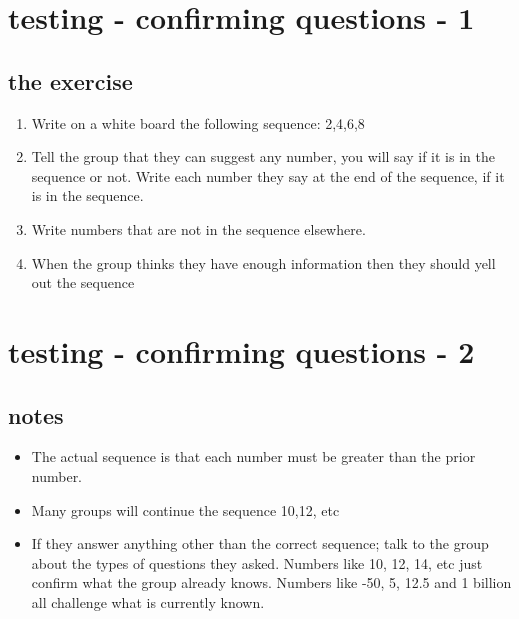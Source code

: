 \section*{testing - confirming questions - 1}
\subsection*{the exercise}
\begin{enumerate}
\item Write on a white board the following sequence: 2,4,6,8
\item Tell the group that they can suggest any number, you will say if it is in the sequence or not. Write each number they say at the end of the sequence, if it is in the sequence.
\item Write numbers that are not in the sequence elsewhere.
\item When the group thinks they have enough information then they should yell out the sequence
\end{enumerate}
\clearpage
\section*{testing - confirming questions - 2}
\subsection*{notes}
\begin{itemize}
\item The actual sequence is that each number must be greater than the prior number.
\item Many groups will continue the sequence 10,12, etc
\item If they answer anything other than the correct sequence; talk to the group about the types of questions they asked. Numbers like 10, 12, 14, etc just confirm what the group already knows. Numbers like -50, 5, 12.5 and 1 billion all challenge what is currently known.
\end{itemize}